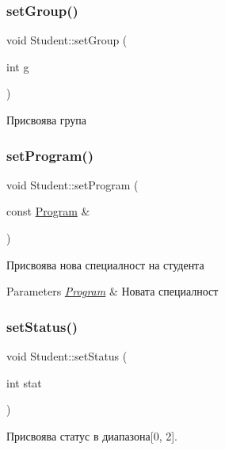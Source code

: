 \subsubsection{\texorpdfstring{set\+Group()}{setGroup()}}
{\footnotesize\ttfamily void Student\+::set\+Group (\begin{DoxyParamCaption}\item[{int}]{g }\end{DoxyParamCaption})}



Присвоява група 

\mbox{\label{class_student_a75ce18eab05c57afd31036ffa8cea201}} 
\subsubsection{\texorpdfstring{set\+Program()}{setProgram()}}
{\footnotesize\ttfamily void Student\+::set\+Program (\begin{DoxyParamCaption}\item[{const \hyperlink{class_program}{Program} \&}]{ }\end{DoxyParamCaption})}



Присвоява нова специалност на студента 


\begin{DoxyParams}{Parameters}
{\em \hyperlink{class_program}{Program}} & Новата специалност \\
\hline
\end{DoxyParams}
\mbox{\label{class_student_a2d6d1de16bb99c7678f2ef8004928d18}} 
\subsubsection{\texorpdfstring{set\+Status()}{setStatus()}}
{\footnotesize\ttfamily void Student\+::set\+Status (\begin{DoxyParamCaption}\item[{int}]{stat }\end{DoxyParamCaption})}



Присвоява статус в диапазона\mbox{[}0, 2\mbox{]}. 


